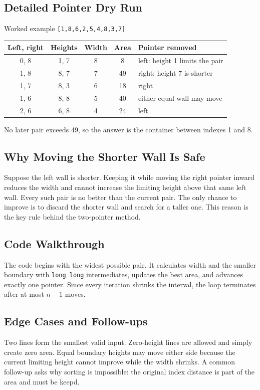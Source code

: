 \subsection{Detailed Pointer Dry Run}
\begin{dryrunbox}{Worked example \texttt{[1,8,6,2,5,4,8,3,7]}}
\begin{center}
\begin{tabularx}{\linewidth}{@{}c c c c X@{}}
\toprule
Left, right & Heights & Width & Area & Pointer removed \\
\midrule
0, 8 & 1, 7 & 8 & 8 & left: height 1 limits the pair \\
1, 8 & 8, 7 & 7 & 49 & right: height 7 is shorter \\
1, 7 & 8, 3 & 6 & 18 & right \\
1, 6 & 8, 8 & 5 & 40 & either equal wall may move \\
2, 6 & 6, 8 & 4 & 24 & left \\
\bottomrule
\end{tabularx}
\end{center}
No later pair exceeds 49, so the answer is the container between indexes 1
and 8.
\end{dryrunbox}

\subsection{Why Moving the Shorter Wall Is Safe}
Suppose the left wall is shorter. Keeping it while moving the right pointer
inward reduces the width and cannot increase the limiting height above that
same left wall. Every such pair is no better than the current pair. The only
chance to improve is to discard the shorter wall and search for a taller one.
This reason is the key rule behind the two-pointer method.

\subsection{Code Walkthrough}
The code begins with the widest possible pair. It calculates width and the
smaller boundary with \texttt{long long} intermediates, updates the best area,
and advances exactly one pointer. Since every iteration shrinks the interval,
the loop terminates after at most \(n-1\) moves.

\subsection{Edge Cases and Follow-ups}
Two lines form the smallest valid input. Zero-height lines are allowed and
simply create zero area. Equal boundary heights may move either side because
the current limiting height cannot improve while the width shrinks. A common
follow-up asks why sorting is impossible: the original index distance is part
of the area and must be keepd.

